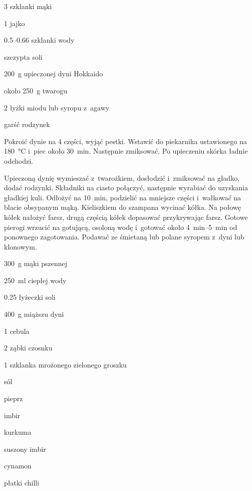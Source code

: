 \documentclass[../kucharek.tex]{subfiles}
\begin{document}
\begin{Ingred}[ciasto]
    \item \num{3} szklanki mąki
    \item \num{1} jajko
    \item \numrange{.5}{.66} szklanki wody
    \item szczypta soli
\end{Ingred}

\begin{Ingred}[farsz]
    \item \qty{200}{\gram} upieczonej dyni Hokkaido
    \item około \qty{250}{\gram} twarogu
    \item \num{2} łyżki miodu lub syropu z~agawy
    \item garść rodzynek
\end{Ingred}

Pokroić dynie na \num{4} części, wyjąć pestki. Wstawić do piekarnika
ustawionego na \qty{180}{\celsius} i~piec około \qty{30}{\minute}. Następnie
zmiksować. Po upieczeniu skórka ładnie odchodzi.

Upieczoną dynię wymieszać z~twarożkiem, dosłodzić i~zmiksować na gładko, dodać
rodzynki. Składniki na ciasto połączyć, następnie wyrabiać do uzyskania
gładkiej kuli. Odłożyć na \qty{10}{\minute}, podzielić na mniejsze części
i~wałkować na blacie obsypanym mąką. Kieliszkiem do szampana wycinać kółka. Na
połowę kółek nałożyć farsz, drugą częścią kółek dopasować przykrywając farsz.
Gotowe pierogi wrzucić na gotującą, osoloną wodę i~gotować około
\qtyrange{4}{5}{\minute} od ponownego zagotowania. Podawać ze śmietaną lub
polane syropem z~dyni lub klonowym.


\begin{Ingred}[ciasto]
    \item \qty{300}{\gram} mąki pszennej
    \item \qty{250}{\milli\litre} ciepłej wody
    \item \num{.25} łyżeczki soli
\end{Ingred}

\begin{Ingred}[farsz]
    \item \qty{400}{\gram} miąższu dyni
    \item \num{1} cebula
    \item \num{2} ząbki czosnku
    \item \num{1} szklanka mrożonego zielonego groszku
    \item sól
    \item pieprz
    \item imbir
    \item kurkuma
    \item suszony imbir
    \item cynamon
    \item płatki chilli
\end{Ingred}
\end{document}
